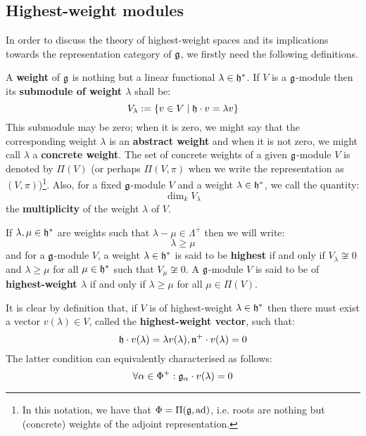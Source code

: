     \subsection{Highest-weight modules}
        In order to discuss the theory of highest-weight spaces and its implications towards the representation category of $\mathfrak{g}$, we firstly need the following definitions.
        \begin{definition} \label{def: weights_and_weight_modules}
            A \textbf{weight} of $\mathfrak{g}$ is nothing but a linear functional $\lambda \in \mathfrak{h}^*$. If $V$ is a $\mathfrak{g}$-module then its \textbf{submodule of weight $\lambda$} shall be:
                $$V_{\lambda} := \{v \in V \mid \mathfrak{h} \cdot v = \lambda v\}$$
            This submodule may be zero; when it is zero, we might say that the corresponding weight $\lambda$ is an \textbf{abstract weight} and when it is not zero, we might call $\lambda$ a \textbf{concrete weight}. The set of concrete weights of a given $\mathfrak{g}$-module $V$ is denoted by $\Pi(V)$ (or perhaps $\Pi(V, \pi)$ when we write the representation as $(V, \pi)$)\footnote{In this notation, we have that $\Phi = \Pi(\mathfrak{g}, \mathrm{ad})$, i.e. roots are nothing but (concrete) weights of the adjoint representation.}. Also, for a fixed $\mathfrak{g}$-module $V$ and a weight $\lambda \in \mathfrak{h}^*$, we call the quantity:
                $$\dim_k V_{\lambda}$$
            the \textbf{multiplicity} of the weight $\lambda$ of $V$.
        \end{definition}
        \begin{definition} \label{def: highest_weights_and_highest_weight_modules}
            If $\lambda, \mu \in \mathfrak{h}^*$ are weights such that $\lambda - \mu \in \Lambda^+$ then we will write:
                $$\lambda \geq \mu$$
            and for a $\mathfrak{g}$-module $V$, a weight $\lambda \in \mathfrak{h}^*$ is said to be \textbf{highest} if and only if $V_{\lambda} \not \cong 0$ and $\lambda \geq \mu$ for all $\mu \in \mathfrak{h}^*$ such that $V_{\mu} \not \cong 0$. A $\mathfrak{g}$-module $V$ is said to be of \textbf{highest-weight $\lambda$} if and only if $\lambda \geq \mu$ for all $\mu \in \Pi(V)$.
        \end{definition}
        \begin{remark}
            It is clear by definition that, if $V$ is of highest-weight $\lambda \in \mathfrak{h}^*$ then there must exist a vector $v(\lambda) \in V$, called the \textbf{highest-weight vector}, such that:
                $$\mathfrak{h} \cdot v(\lambda) = \lambda v(\lambda), \mathfrak{n}^+ \cdot v(\lambda) = 0$$
            The latter condition can equivalently characterised as follows:
                $$\forall \alpha \in \Phi^+: \mathfrak{g}_{\alpha} \cdot v(\lambda) = 0$$
        \end{remark}

